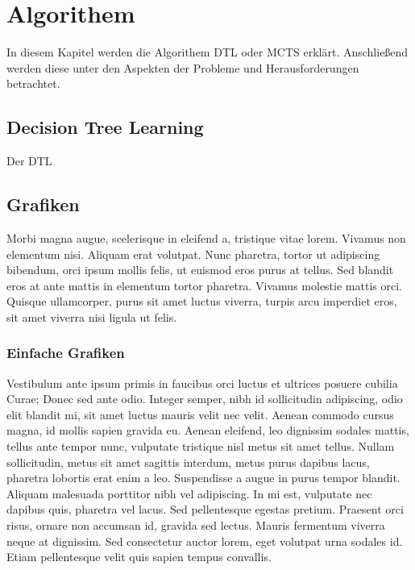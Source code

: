 \chapter{Algorithem}
\label{ch:chapter03}
In diesem Kapitel werden die Algorithem \ac{DTL} oder \ac{MCTS} erklärt.
Anschließend werden diese unter den Aspekten der Probleme und Herausforderungen betrachtet.

%
%
\section{Decision Tree Learning}
\label{sec:chapter03:listen}
Der \ac{DTL} 


%
%
\section{Grafiken}
\label{sec:chapter03:grafiken}
Morbi magna augue, scelerisque in eleifend a, tristique vitae lorem. Vivamus non elementum nisi. Aliquam erat volutpat. Nunc pharetra, tortor ut adipiscing bibendum, orci ipsum mollis felis, ut euismod eros purus at tellus. Sed blandit eros at ante mattis in elementum tortor pharetra. Vivamus molestie mattis orci. Quisque ullamcorper, purus sit amet luctus viverra, turpis arcu imperdiet eros, sit amet viverra nisi ligula ut felis.

\subsection{Einfache Grafiken}
\label{sec:chapter03:grafiken:simple}
Vestibulum ante ipsum primis in faucibus orci luctus et ultrices posuere cubilia Curae; Donec sed ante odio. Integer semper, nibh id sollicitudin adipiscing, odio elit blandit mi, sit amet luctus mauris velit nec velit. Aenean commodo cursus magna, id mollis sapien gravida eu. Aenean eleifend, leo dignissim sodales mattis, tellus ante tempor nunc, vulputate tristique nisl metus sit amet tellus. Nullam sollicitudin, metus sit amet sagittis interdum, metus purus dapibus lacus, pharetra lobortis erat enim a leo. Suspendisse a augue in purus tempor blandit. Aliquam malesuada porttitor nibh vel adipiscing. In mi est, vulputate nec dapibus quis, pharetra vel lacus. Sed pellentesque egestas pretium. Praesent orci risus, ornare non accumsan id, gravida sed lectus. Mauris fermentum viverra neque at dignissim. Sed consectetur auctor lorem, eget volutpat urna sodales id. Etiam pellentesque velit quis sapien tempus convallis. 

